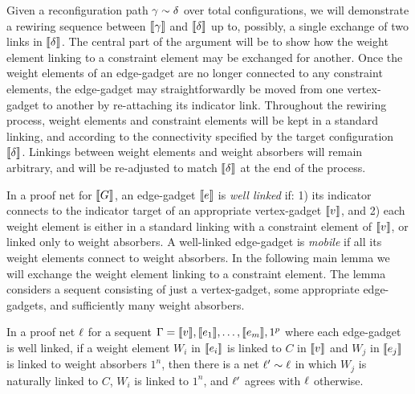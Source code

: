 \documentclass[conference]{IEEEtran}
\let\aftersubsection=\noindent
\begin{document}
\aftersubsection
Given a reconfiguration path $\gamma\perm\delta$ over total configurations, we will demonstrate a rewiring sequence between $\llbracket\gamma\rrbracket$ and $\llbracket\delta\rrbracket$ up to, possibly, a single exchange of two links in $\llbracket\delta\rrbracket$.
%
The central part of the argument will be to show how the weight element linking to a constraint element may be exchanged for another.
%
Once the weight elements of an edge-gadget are no longer connected to any constraint elements, the edge-gadget may straightforwardly be moved from one vertex-gadget to another by re-attaching its indicator link.
%
Throughout the rewiring process, weight elements and constraint elements will be kept in a standard linking, and according to the connectivity specified by the target configuration $\llbracket\delta\rrbracket$.
%
Linkings between weight elements and weight absorbers will remain arbitrary, and will be re-adjusted to match $\llbracket\delta\rrbracket$ at the end of the process.



In a proof net for $\llbracket G\rrbracket$, an edge-gadget $\llbracket e\rrbracket$ is \emph{well linked} if: 1) its indicator connects to the indicator target of an appropriate vertex-gadget $\llbracket v\rrbracket$, and 2) each weight element is either in a standard linking with a constraint element of $\llbracket v\rrbracket$, or linked only to weight absorbers.
%
A well-linked edge-gadget is \emph{mobile} if all its weight elements connect to weight absorbers.
%
In the following main lemma we will exchange the weight element linking to a constraint element.
%
The lemma considers a sequent consisting of just a vertex-gadget, some appropriate edge-gadgets, and sufficiently many weight absorbers.


\begin{lemma}
\label{lem:octopus roll}
In a proof net $\ell$ for a sequent $\Gamma=\llbracket v\rrbracket,\llbracket e_1\rrbracket,\dotsc,\llbracket e_m\rrbracket,1^p$ where each edge-gadget is well linked, if a weight element $W_i$ in $\llbracket e_i\rrbracket$ is linked to $C$ in $\llbracket v\rrbracket$ and $W_j$ in $\llbracket e_j\rrbracket$ is linked to weight absorbers $1^n$, then there is a net $\links'\perm\links$ in which $W_j$ is naturally linked to $C$, $W_i$ is linked to $1^n$, and $\ell'$ agrees with $\ell$ otherwise.
\end{lemma}


\renewcommand\scalefactor{0.88}

\newcommand\displayOcto[1]{%
 \NoIndent{%
   \smallskip%
   \centerline{%
	 \scale{#1}%
  }}%
  \bigskip%
}
\end{document}
